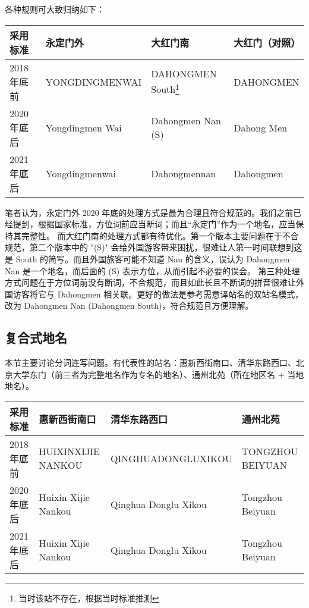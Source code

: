 \documentclass[a4paper,UTF8,12pt]{ctexart}
\begin{document}
        各种规则可大致归纳如下：

        \begin{table}[h]
            \begin{tabular}{|l|l|l|l|}
            \hline
            \textbf{采用标准}     & \textbf{永定门外}            & \textbf{大红门南}              & \textbf{大红门（对照）}    \\ \hline
            2018 年底前 & YONGDINGMENWAI  & DAHONGMEN South\footnote{当时该站不存在，根据当时标准推测}   & DAHONGMEN  \\ \hline
            2020 年底后 & Yongdingmen Wai & Dahongmen Nan (S) & Dahong Men \\ \hline
            2021 年底后 & Yongdingmenwai  & Dahongmennan      & Dahongmen \\ \hline
            \end{tabular}
        \end{table}

        笔者认为，永定门外 2020 年底的处理方式是最为合理且符合规范的。我们之前已经提到，根据国家标准，方位词前应当断词；而且“永定门”作为一个地名，应当保持其完整性。
        而大红门南的处理方式都有待优化。第一个版本主要问题在于不合规范，第二个版本中的 "(S)" 会给外国游客带来困扰，很难让人第一时间联想到这是 South 的简写。而且外国旅客可能不知道 Nan 的含义，误认为 Dahongmen Nan 是一个地名，而后面的 (S) 表示方位，从而引起不必要的误会。
        第三种处理方式问题在于方位词前没有断词，不合规范，而且如此长且不断词的拼音很难让外国访客将它与 Dahongmen 相关联。更好的做法是参考需意译站名的双站名模式，改为 Dahongmen Nan (Dahongmen South)，符合规范且方便理解。

    \subsection{复合式地名}
        本节主要讨论分词连写问题。有代表性的站名：惠新西街南口、清华东路西口、北京大学东门（前三者为完整地名作为专名的地名）、通州北苑（所在地区名 + 当地地名）。
        \begin{table}[h]
            \begin{tabular}{|l|l|l|l|}
            \hline
            \textbf{采用标准}     & \textbf{惠新西街南口}              & \textbf{清华东路西口}               & \textbf{通州北苑}             \\ \hline
            2018 年底前 & HUIXINXIJIE NANKOU  & QINGHUADONGLUXIKOU   & TONGZHOU BEIYUAN \\ \hline
            2020 年底后 & Huixin Xijie Nankou & Qinghua Donglu Xikou & Tongzhou Beiyuan \\ \hline
            2021 年底后 & Huixin Xijie Nankou & Qinghua Donglu Xikou & Tongzhou Beiyuan \\ \hline
            \end{tabular}
        \end{table}
\end{document}

